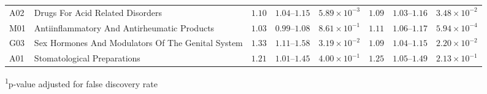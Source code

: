\begin{longtable}{llrrrrrr}
A02 & Drugs For Acid Related Disorders & $1.10$ & $1.04$–$1.15$ & $5.89 \times 10^{-3}$ & $1.09$ & $1.03$–$1.16$ & $3.48 \times 10^{-2}$ \\ 
M01 & Antiinflammatory And Antirheumatic Products & $1.03$ & $0.99$–$1.08$ & $8.61 \times 10^{-1}$ & $1.11$ & $1.06$–$1.17$ & $5.94 \times 10^{-4}$ \\ 
G03 & Sex Hormones And Modulators Of The Genital System & $1.33$ & $1.11$–$1.58$ & $3.19 \times 10^{-2}$ & $1.09$ & $1.04$–$1.15$ & $2.20 \times 10^{-2}$ \\ 
A01 & Stomatological Preparations & $1.21$ & $1.01$–$1.45$ & $4.00 \times 10^{-1}$ & $1.25$ & $1.05$–$1.49$ & $2.13 \times 10^{-1}$ \\ 
\bottomrule
\end{longtable}
\begin{minipage}{\linewidth}
\textsuperscript{1}p-value adjusted for false discovery rate\\
\end{minipage}

